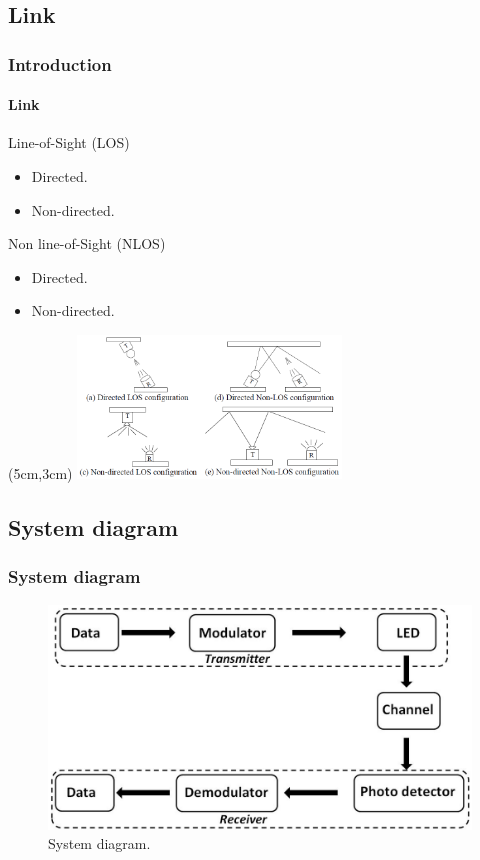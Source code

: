 \documentclass[mathserif]{beamer}
\newcommand{\wait}{\vfill}
\begin{document}
\subsection{Link}
\begin{frame}
\frametitle{Introduction}
\framesubtitle{Link}
	Line-of-Sight (LOS)
	\begin{itemize}
		\item Directed.
		\item Non-directed.
	\end{itemize}

	\wait
	Non line-of-Sight (NLOS)
	\begin{itemize}
		\item Directed.
		\item Non-directed.
	\end{itemize}

	\begin{textblock*}{7cm}(5cm,3cm) %
		\includegraphics[width=7cm]{figuras/link.png}
	\end{textblock*}
\end{frame}	

\subsection{System diagram}
\begin{frame}
\frametitle{System diagram}
\begin{figure}
	\centering
	\includegraphics[width=\linewidth]{figuras/transceptor}
	\caption{System diagram.}
	\label{fig:transceptor}
\end{figure}
\end{frame}
\end{document}
